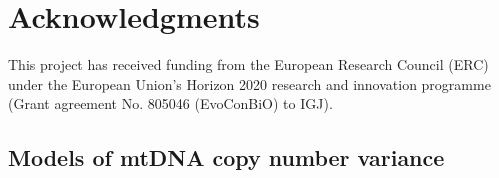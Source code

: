 \documentclass[12pt]{article}
\begin{document}
\section*{Acknowledgments}
This project has received funding from the European Research Council (ERC) under the European Union's Horizon 2020 research and innovation programme (Grant agreement No. 805046 (EvoConBiO) to IGJ).



\clearpage
\newpage

\begin{appendices}
\section{Models of mtDNA copy number variance}

\end{appendices}
\end{document}
